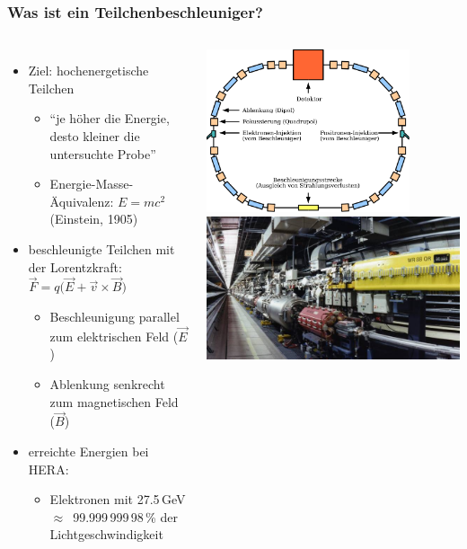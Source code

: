 \documentclass[10pt,t]{beamer}
\begin{document}
\begin{frame}
\frametitle{Was ist ein Teilchenbeschleuniger?}
\vspace*{-2\baselineskip}
\begin{columns}[c]
\begin{itemize}
    \item Ziel: hochenergetische Teilchen
    \begin{itemize}
        \item ``je höher die Energie, desto kleiner die untersuchte Probe''
        \item Energie-Masse-Äquivalenz: $E=mc^2$ (Einstein, 1905)
    \end{itemize}
    \item beschleunigte Teilchen mit der Lorentzkraft: $\vec{F}=q\Big(\vec{E}+\vec{v}\times\vec{B}\Big)$
    \begin{itemize}
        \item Beschleunigung parallel zum elektrischen Feld ($\vec{E}$)
        \item Ablenkung senkrecht zum magnetischen Feld ($\vec{B}$)
    \end{itemize}
    \item erreichte Energien bei HERA:
    \begin{itemize}
        \item Elektronen mit 27.5\,GeV $\approx$~99.999\,999\,98\,\% der Lichtgeschwindigkeit
    \end{itemize}
\end{itemize}
\centering
    \includegraphics[width=0.8\textwidth]{beschleuniger-schema-de} \\[1em]
    \includegraphics[width=\textwidth,trim={0 0 0 0},clip]{beschleuniger-tunnel}

\end{columns}
\end{frame}
\end{document}
